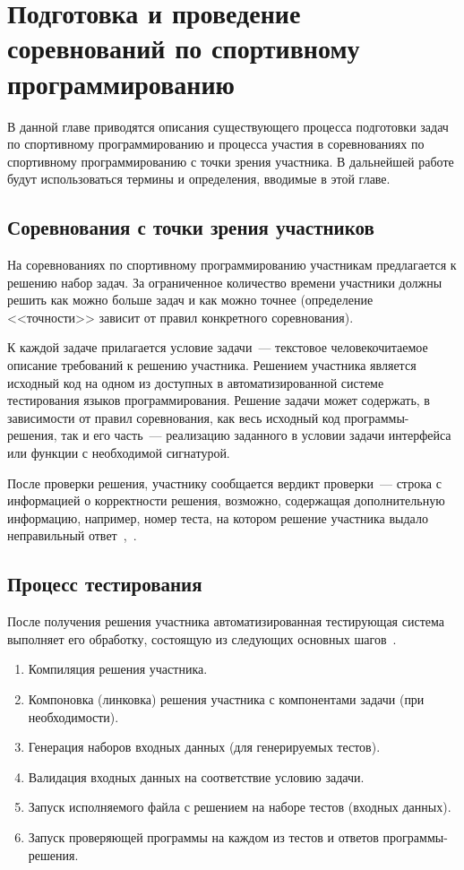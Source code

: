 \documentclass[times,specification,annotation]{style/itmo-student-thesis/itmo-student-thesis}
\begin{document}
\chapter{Подготовка и проведение соревнований по спортивному программированию}

В данной главе приводятся описания существующего процесса подготовки задач по спортивному программированию и процесса участия в соревнованиях по спортивному программированию с точки зрения участника. В дальнейшей работе будут использоваться термины и определения, вводимые в этой главе.

\section{Соревнования с точки зрения участников}

На соревнованиях по спортивному программированию участникам предлагается к решению набор задач. За ограниченное количество времени участники должны решить как можно больше задач и как можно точнее (определение <<точности>> зависит от правил конкретного соревнования).

К каждой задаче прилагается условие задачи~--- текстовое человекочитаемое описание требований к решению участника. Решением участника является исходный код на одном из доступных в автоматизированной системе тестирования языков программирования. Решение задачи может содержать, в зависимости от правил соревнования, как весь исходный код программы-решения, так и его часть~--- реализацию заданного в условии задачи интерфейса или функции с необходимой сигнатурой.

После проверки решения, участнику сообщается вердикт проверки~--- строка с информацией о корректности решения, возможно, содержащая дополнительную информацию, например, номер теста, на котором решение участника выдало неправильный ответ~\cite{codeforces-rules},~\cite{nerc-rules}.

\section{Процесс тестирования}

После получения решения участника автоматизированная тестирующая система выполняет его обработку, состоящую из следующих основных шагов~\cite{roi-regionals-requirements}.

\begin{enumerate}[leftmargin=1.75cm]
    \item Компиляция решения участника.
    \item Компоновка (линковка) решения участника с компонентами задачи (при необходимости).
    \item Генерация наборов входных данных (для генерируемых тестов).
    \item Валидация входных данных на соответствие условию задачи.
    \item Запуск исполняемого файла с решением на наборе тестов (входных данных).
    \item Запуск проверяющей программы на каждом из тестов и ответов программы-решения.
\end{enumerate}
\end{document}
